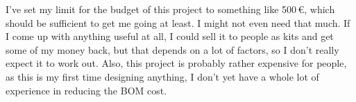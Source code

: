 \documentclass[a4paper]{article}
\begin{document}
I've set my limit for the budget of this project to something like 500\,€, which should be sufficient to get me going at least. I might not even need that much. If I come up with anything useful at all, I could sell it to people as kits and get some of my money back, but that depends on a lot of factors, so I don't really expect it to work out. Also, this project is probably rather expensive for people, as this is my first time designing anything, I don't yet have a whole lot of experience in reducing the BOM cost.
\end{document}
